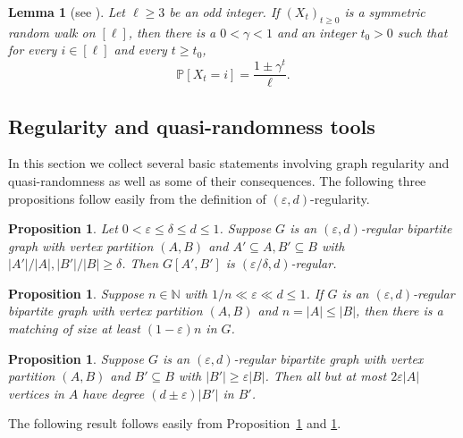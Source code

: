 \documentclass[a4paper, 11pt, reqno]{amsart}
\newtheorem{proposition}[definition]{Proposition}
\newtheorem{lemma}[definition]{Lemma}
\numberwithin{equation}{section}
\newcommand{\1}{{\rm 1\hspace*{-0.4ex}%
\rule{0.1ex}{1.52ex}\hspace*{0.2ex}}}
\newcommand{\N}{\mathbb N}
\newcommand{\Pro}{\mathbb{P}}
\renewcommand{\epsilon}{\varepsilon}
\newcommand{\COMMENT}[1]{}
\begin{document}
\begin{lemma}[see \cite{Kle14}]\label{lem: random walk}
Let $\ell\geq 3$ be an odd integer. 
If $(X_t)_{t\geq 0}$ is a symmetric random walk on $[\ell]$,
then there is a $0<\gamma<1$ and an integer $t_0>0$ such that for every $i\in [\ell]$ and every $t\geq t_0$,
$$\Pro[X_t=i]=\frac{1\pm \gamma^t}{\ell}.$$
\end{lemma}



\subsection{Regularity and quasi-randomness tools}

In this section we collect several basic statements involving graph regularity and quasi-randomness as well as
some of their consequences.
The following three propositions follow easily from the definition of $(\epsilon,d)$-regularity.

\begin{proposition}\label{prop: reg smaller}
Let $0<\epsilon\leq \delta \leq d \leq 1$. Suppose $G$ is an $(\epsilon,d)$-regular bipartite graph with vertex partition $(A,B)$ and $A' \subseteq A,B'\subseteq B$ with ${|A'|}/{|A|}, {|B'|}/{|B|}\geq \delta$.
Then $G[A',B']$ is $(\epsilon/\delta, d)$-regular.
\end{proposition}

\begin{proposition}\label{prop: matching}
Suppose $n\in \N$ with $1/n\ll \epsilon \ll d \leq 1$.
If $G$ is an $(\epsilon,d)$-regular bipartite graph with vertex partition $(A,B)$ and $n=|A|\leq|B|$,
then there is a matching of size at least $(1-\epsilon)n$ in $G$.
\end{proposition}


\begin{proposition}\label{prop: reg right deg}
Suppose $G$ is an $(\epsilon, d)$-regular bipartite graph with vertex partition $(A,B)$ and $B' \subseteq B$ with $|B'|\geq \epsilon|B|$. Then all but
at most $2\epsilon |A|$ vertices in $A$ have degree $(d \pm \epsilon)|B'|$ in $B'$.
\end{proposition}



The following result follows easily from Proposition~\ref{prop: reg smaller} and \ref{prop: reg right deg}.
\end{document}
